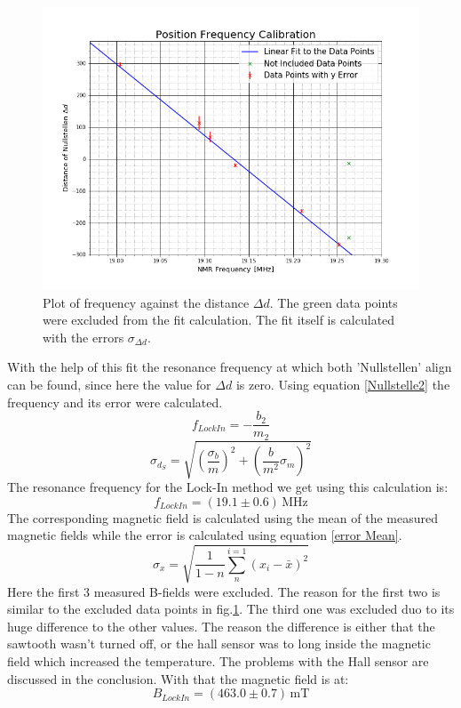 \begin{figure}[h]
	\includegraphics[scale=0.5]{Bild/Eichung.png}
	\centering
	\caption{Plot of frequency against the distance $\Delta d$. The green data points were excluded from the fit calculation. The fit itself is calculated with the errors $\sigma_{\Delta d}$.}
	\label{Nullstellenfit}
\end{figure}
With the help of this fit the resonance frequency at which both 'Nullstellen' align can be found, since here the value for $\Delta d$ is zero. Using equation \ref{Nullstelle2} the frequency and its error were calculated.
\begin{equation}
f_{LockIn}=-\frac{b_2}{m_2}
\label{Nullstelle2}
\end{equation}
\begin{equation}
\sigma_{d_S}=\sqrt{(\frac{\sigma_{b}}{m})^2+(\frac{b}{m^2}\sigma_{m})^2}
\end{equation}
The resonance frequency for the Lock-In method we get using this calculation is:$$f_{LockIn}=(19.1\pm0.6)\,\text{MHz}$$
The corresponding magnetic field is calculated using the mean of the measured magnetic fields while the error is calculated using equation \ref{error Mean}.
\begin{equation}
	\sigma_x=\sqrt{\frac{1}{1-n}\sum_{n}^{i=1}(x_i-\bar{x})^2}
	\label{error Mean}
\end{equation}
Here the first 3 measured B-fields were excluded. The reason for the first two is similar to the excluded data points in fig.\ref{Nullstellenfit}. The third one was excluded duo to its huge difference to the other values. The reason the difference is either that the sawtooth wasn't turned off, or the hall sensor was to long inside the magnetic field which increased the temperature. The problems with the Hall sensor are discussed in the conclusion. With that the magnetic field is at:
$$B_{LockIn} = (463.0\pm0.7)\,\text{mT}$$

